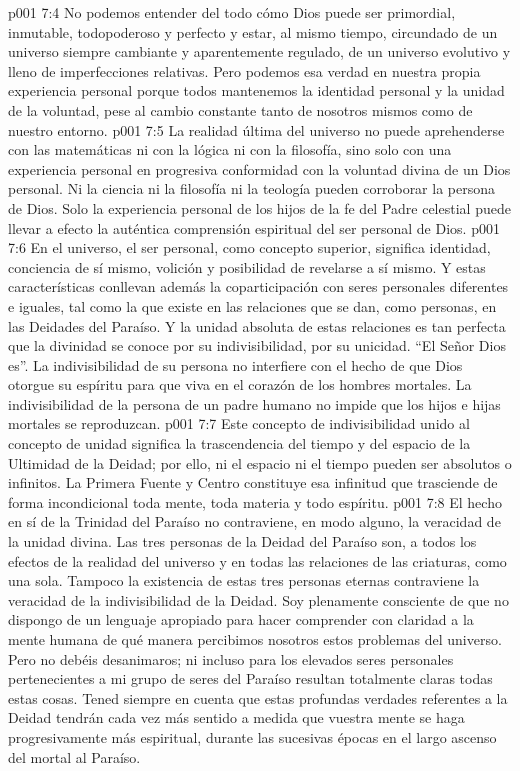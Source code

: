 \vs p001 7:4 \pc No podemos entender del todo cómo Dios puede ser primordial, inmutable, todopoderoso y perfecto y estar, al mismo tiempo, circundado de un universo siempre cambiante y aparentemente regulado, de un universo evolutivo y lleno de imperfecciones relativas. Pero podemos  esa verdad en nuestra propia experiencia personal porque todos mantenemos la identidad personal y la unidad de la voluntad, pese al cambio constante tanto de nosotros mismos como de nuestro entorno.
\vs p001 7:5 La realidad última del universo no puede aprehenderse con las matemáticas ni con la lógica ni con la filosofía, sino solo con una experiencia personal en progresiva conformidad con la voluntad divina de un Dios personal. Ni la ciencia ni la filosofía ni la teología pueden corroborar la persona de Dios. Solo la experiencia personal de los hijos de la fe del Padre celestial puede llevar a efecto la auténtica comprensión espiritual del ser personal de Dios.
\vs p001 7:6 \pc En el universo, el ser personal, como concepto superior, significa identidad, conciencia de sí mismo, volición y posibilidad de revelarse a sí mismo. Y estas características conllevan además la coparticipación con seres personales diferentes e iguales, tal como la que existe en las relaciones que se dan, como personas, en las Deidades del Paraíso. Y la unidad absoluta de estas relaciones es tan perfecta que la divinidad se conoce por su indivisibilidad, por su unicidad. “El Señor Dios  es”. La indivisibilidad de su persona no interfiere con el hecho de que Dios otorgue su espíritu para que viva en el corazón de los hombres mortales. La indivisibilidad de la persona de un padre humano no impide que los hijos e hijas mortales se reproduzcan.
\vs p001 7:7 Este concepto de indivisibilidad unido al concepto de unidad significa la trascendencia del tiempo y del espacio de la Ultimidad de la Deidad; por ello, ni el espacio ni el tiempo pueden ser absolutos o infinitos. La Primera Fuente y Centro constituye esa infinitud que trasciende de forma incondicional toda mente, toda materia y todo espíritu.
\vs p001 7:8 El hecho en sí de la Trinidad del Paraíso no contraviene, en modo alguno, la veracidad de la unidad divina. Las tres personas de la Deidad del Paraíso son, a todos los efectos de la realidad del universo y en todas las relaciones de las criaturas, como una sola. Tampoco la existencia de estas tres personas eternas contraviene la veracidad de la indivisibilidad de la Deidad. Soy plenamente consciente de que no dispongo de un lenguaje apropiado para hacer comprender con claridad a la mente humana de qué manera percibimos nosotros estos problemas del universo. Pero no debéis desanimaros; ni incluso para los elevados seres personales pertenecientes a mi grupo de seres del Paraíso resultan totalmente claras todas estas cosas. Tened siempre en cuenta que estas profundas verdades referentes a la Deidad tendrán cada vez más sentido a medida que vuestra mente se haga progresivamente más espiritual, durante las sucesivas épocas en el largo ascenso del mortal al Paraíso.
